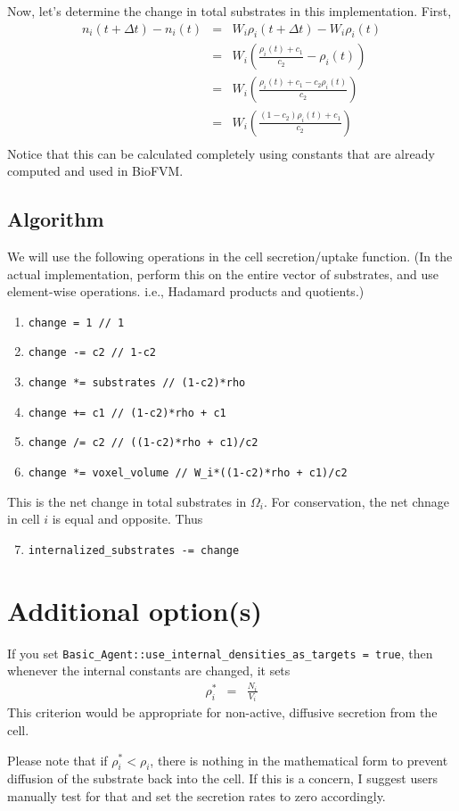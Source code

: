 \documentclass[11point]{article}
\newcommand{\beq}{\begin{eqnarray}}
\newcommand{\eeq}{\end{eqnarray}}
\begin{document}
Now, let's determine the change in total substrates in this implementation. First, 
\beq
n_i(t+\Delta t ) - n_i(t) & = & 
W_i \rho_i(t+\Delta t) - W_i \rho_i(t) \\
& = & 
W_i \left( \frac{\rho_i(t)+c_1}{c_2} - \rho_i(t) \right) \\ 
& = & 
W_i \left( \frac{\rho_i(t) + c_1  - c_2 \rho_i(t) }{c_2} \right) \\ 
& = & 
W_i \left( \frac{ (1-c_2) \rho_i(t) + c_1  }{c_2} \right) \\ 
\eeq
Notice that this can be calculated completely using constants that are already computed and used in BioFVM. 
\subsection{Algorithm}
We will use the following operations in the cell secretion/uptake function. (In the actual implementation, 
perform this on the entire vector of substrates, and use element-wise operations. i.e., Hadamard products and 
quotients.) 
\begin{enumerate}
\item 
\verb|change = 1 // 1|
\item 
\verb|change -= c2 // 1-c2|
\item 
\verb|change *= substrates // (1-c2)*rho|
\item 
\verb|change += c1 // (1-c2)*rho + c1|
\item 
\verb|change /= c2 // ((1-c2)*rho + c1)/c2|
\item 
\verb|change *= voxel_volume // W_i*((1-c2)*rho + c1)/c2|
\end{enumerate}
This is the net change in total substrates in $\Omega_i$. For conservation, 
the net chnage in cell $i$ is equal and opposite. Thus 
\begin{enumerate}
\setcounter{enumi}{6}
\item 
\verb|internalized_substrates -= change|
\end{enumerate}

\section{Additional option(s)}
If you set \verb|Basic_Agent::use_internal_densities_as_targets = true|, then whenever
the internal constants are changed, it sets 
\beq
\rho_i^* & = & \frac{N_i}{V_i}
\eeq
This criterion would be appropriate for non-active, diffusive secretion from the cell. 

Please note that 
if $\rho_i^* < \rho_i$, there is nothing in the mathematical form to prevent diffusion of the substrate 
back into the cell. If this is a concern, I suggest users manually test for that and set 
the secretion rates to zero accordingly. 
\end{document}
